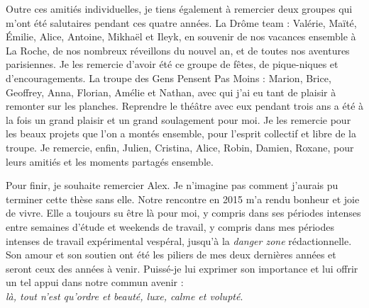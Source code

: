 \bigskip
Outre ces amitiés individuelles, je tiens également à remercier deux groupes qui m'ont été salutaires pendant ces quatre années.
La \og Drôme team \fg{} : Valérie, Maïté, Émilie, Alice, Antoine, Mikhaël et Ileyk, en souvenir de nos vacances ensemble à La Roche, de nos nombreux réveillons du nouvel an, et de toutes nos aventures parisiennes.
Je les remercie d'avoir été ce groupe de fêtes, de pique-niques et d'encouragements.
La troupe des Gens Pensent Pas Moins : Marion, Brice, Geoffrey, Anna, Florian, Amélie et Nathan, avec qui j'ai eu tant de plaisir à remonter sur les planches.
Reprendre le théâtre avec eux pendant trois ans a été à la fois un grand plaisir et un grand soulagement pour moi.
Je les remercie pour les beaux projets que l'on a montés ensemble, pour l'esprit collectif et libre de la troupe.
Je remercie, enfin, Julien, Cristina, Alice, Robin, Damien, Roxane, pour leurs amitiés et les moments partagés ensemble.

\bigskip
Pour finir, je souhaite remercier Alex.
Je n'imagine pas comment j'aurais pu terminer cette thèse sans elle.
Notre rencontre en 2015 m'a rendu bonheur et joie de vivre.
Elle a toujours su être là pour moi, y compris dans ses périodes intenses entre semaines d'étude et weekends de travail, y compris dans mes périodes intenses de travail expérimental vespéral, jusqu'à la \textit{danger zone} rédactionnelle.
Son amour et son soutien ont été les piliers de mes deux dernières années et seront ceux des années à venir.
Puissé-je lui exprimer son importance et lui offrir un tel appui dans notre commun avenir :\\
\emph{là, tout n'est qu'ordre et beauté, luxe, calme et volupté}.

\vfill
\vspace{1.5em}

